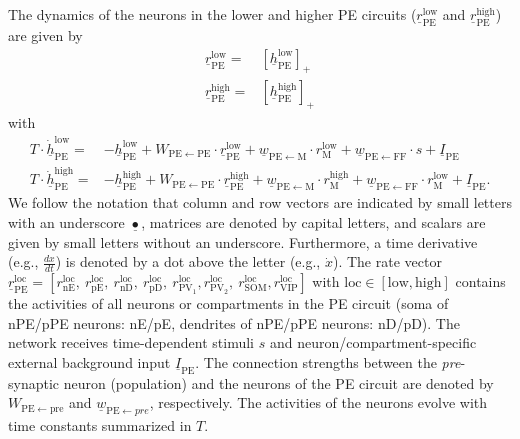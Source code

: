 \documentclass[10pt,a4paper,draft]{article}
\begin{document}
The dynamics of the neurons in the lower and higher PE circuits ($\underline{r}_\mathrm{PE}^\mathrm{low}$ and $\underline{r}_\mathrm{PE}^\mathrm{high}$) are given by
%
\begin{align}
\underline{r}_\mathrm{PE}^\mathrm{low} = & \left[ \underline{h}_\mathrm{PE}^\mathrm{low} \right]_+ \nonumber\\
%
\underline{r}_\mathrm{PE}^\mathrm{high} = & \left[ \underline{h}_\mathrm{PE}^\mathrm{high} \right]_+ 
\end{align}
%
with
%
\begin{align}
T \cdot \underline{\dot{h}}_\mathrm{PE}^\mathrm{low} =& -\underline{h}_\mathrm{PE}^\mathrm{low} + W_\mathrm{PE\leftarrow PE} \cdot \underline{r}_\mathrm{PE}^\mathrm{low} + \underline{w}_\mathrm{PE\leftarrow M} \cdot r_\mathrm{M}^\mathrm{low} + \underline{w}_\mathrm{PE\leftarrow FF} \cdot s + \underline{I}_\mathrm{PE} \nonumber\\
%
T \cdot \underline{\dot{h}}_\mathrm{PE}^\mathrm{high} =& -\underline{h}_\mathrm{PE}^\mathrm{high} + W_\mathrm{PE\leftarrow PE} \cdot \underline{r}_\mathrm{PE}^\mathrm{high} + \underline{w}_\mathrm{PE\leftarrow M} \cdot r_\mathrm{M}^\mathrm{high} + \underline{w}_\mathrm{PE\leftarrow FF} \cdot r_\mathrm{M}^\mathrm{low} + \underline{I}_\mathrm{PE}.
%
\end{align}
%
We follow the notation that column and row vectors are indicated by small letters with an underscore $\underline{\bullet}$, matrices are denoted by capital letters, and scalars are given by small letters without an underscore. Furthermore, a time derivative (e.g., $\frac{dx}{dt}$) is denoted by a dot above the letter (e.g., $\dot{x}$). The rate vector $\underline{r}_\mathrm{PE}^\mathrm{loc} = \left[r_\mathrm{nE}^\mathrm{loc},\ r_\mathrm{pE}^\mathrm{loc},\ r_\mathrm{nD}^\mathrm{loc},\ r_\mathrm{pD}^\mathrm{loc},\ r_\mathrm{PV_1}^\mathrm{loc}, r_\mathrm{PV_2}^\mathrm{loc},\ r_\mathrm{SOM}^\mathrm{loc}, r_\mathrm{VIP}^\mathrm{loc} \right]$  with $\mathrm{loc} \in [\mathrm{low}, \mathrm{high}]$ contains the activities of all neurons or compartments in the PE circuit (soma of nPE/pPE neurons: nE/pE, dendrites of nPE/pPE neurons: nD/pD). The network receives time-dependent stimuli $s$ and neuron/compartment-specific external background input $\underline{I}_\mathrm{PE}$. The connection strengths between the \textit{pre}-synaptic neuron (population) and the neurons of the PE circuit are denoted by $W_\mathrm{PE\leftarrow pre}$ and $\underline{w}_{\mathrm{PE} \leftarrow pre}$, respectively. The activities of the neurons evolve with time constants summarized in $T$.
\end{document}
